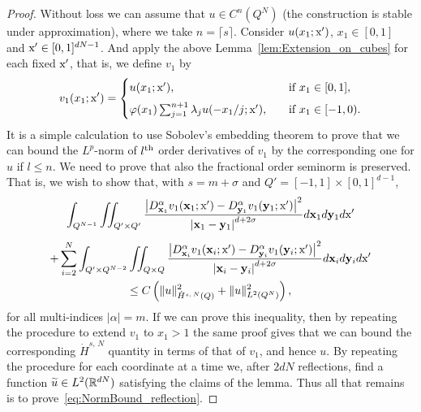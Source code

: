 \documentclass[10pt]{amsart}
\theoremstyle{definition}\newtheorem{defi}[theo]{Definition}\newtheorem{rema}[theo]{Remark}\newtheorem{exam}[theo]{Example}\newtheorem{exem}[theo]{Example}\newtheorem{nota}[theo]{Notation}
\newcommand*\R {\mathbb{R}}
\newcommand\1{{\ensuremath {\mathds 1} }}
\newcommand{\bx}{\mathbf{x}}
\newcommand{\by}{\mathbf{y}}
\newcommand{\sx}{\textup{x}}
\let\oldtilde\tilde
\renewcommand*{\tilde}[1]{\mathchoice{\widetilde{#1}}{\widetilde{#1}}{\oldtilde{#1}}{\oldtilde{#1}}}\let\oldhat\hat
\renewcommand*{\hat}[1]{\mathchoice{\widehat{#1}}{\widehat{#1}}{\oldhat{#1}}{\oldhat{#1}}}\let\oldforall\forall
\renewcommand*{\forall}{\mathrel{\oldforall}}
\begin{document}
\begin{proof}
Without loss we can assume that $u\in C^n(Q^N)$ (the construction is stable under approximation), where we take $n=\lceil s\rceil$. Consider $u(x_1; \sx')$, $x_1\in [0, 1]$ and $\sx'\in [0, 1]^{dN-1}$. And apply the above Lemma~\ref{lem:Extension_on_cubes} for each fixed $\sx'$, that is, we define $v_1$ by
\begin{equation*}
v_1(x_1; \sx')=
\begin{cases}
u(x_1; \sx'), \quad &\text{if } x_1\in [0, 1],\\[0.5em]
\varphi(x_1)\sum_{j=1}^{n+1} \lambda_j u(-x_1/j; \sx'), \quad &\text{if } x_1\in [-1, 0).
\end{cases}
\end{equation*}
It is a simple calculation to use Sobolev's embedding theorem to prove that we can bound the $L^p$-norm of $l^{\rm th}$ order derivatives of $v_1$ by the corresponding one for $u$ if $l\leq n$. We need to prove that also the fractional order seminorm is preserved. That is, we wish to show that, with $s=m+\sigma$ and $Q'=[-1, 1]\times [0, 1]^{d-1}$,
\begin{multline}\label{eq:NormBound_reflection}
\int_{Q^{N-1}} \iint_{Q'\times Q'} \frac{\left|D^\alpha_{\bx_1} v_1(\bx_1;\sx')-D^\alpha_{\by_1} v_1(\by_1; \sx')\right|^2}{\left|\bx_1-\by_1\right|^{d+2\sigma}}d\bx_1 d\by_1 d\sx'\\[5pt]
+\sum_{i=2}^N\int_{Q'\times Q^{N-2}}\iint_{Q\times Q} \frac{\left|D^\alpha_{\bx_i} v_1(\bx_i;\sx')-D^\alpha_{\by_i} v_1(\by_i; \sx')\right|^2}{\left|\bx_i-\by_i\right|^{d+2\sigma}}d\bx_i d\by_i d\sx'\\
\leq C \left(\|u\|_{\dot{H}^{s,\,N}(Q)}^2+ \|u\|_{L^2(Q^N)}^2\right),
\end{multline}
for all multi-indices $|\alpha|=m$. If we can prove this inequality, then by repeating the procedure to extend $v_1$ to $x_1>1$ the same proof gives that we can bound the corresponding $\dot{H}^{s,\,N}$ quantity in terms of that of $v_1$, and hence $u$. By repeating the procedure for each coordinate at a time we, after $2dN$ reflections, find a function $\tilde u\in L^2(\R^{dN})$ satisfying the claims of the lemma. Thus all that remains is to prove~\eqref{eq:NormBound_reflection}.



\end{proof}
\end{document}
